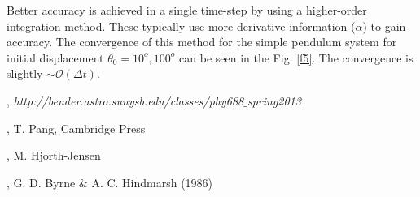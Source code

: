 \documentclass[12pt]{article}
\begin{document}
\quad

Better accuracy is achieved in a single time-step by using a higher-order integration method. These typically use more derivative  information  ($\alpha$) to gain accuracy. The convergence of this method for the simple pendulum system for initial displacement $\theta_0 = 10^o, 100^o$ can be seen in the Fig. \ref{f5}. The convergence is slightly $\sim \mathcal{O}(\Delta t)$.



\newpage





\begin{thebibliography}{}

, {\it http://bender.astro.sunysb.edu/classes/phy688$\_$spring2013}

, T. Pang, Cambridge Press

, M. Hjorth-Jensen

, G. D. Byrne $\&$ A. C. Hindmarsh (1986)

\end{thebibliography}
\end{document}

